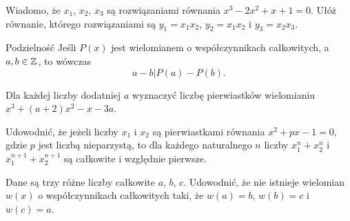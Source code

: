 \documentclass{article}
\begin{document}

%

\begin{zadanie}
  Wiadomo, że $x_1$, $x_2$, $x_3$ są rozwiązaniami równania $x^3-2x^2+x+1=0$. Ułóż równanie, którego rozwiązaniami są $y_1=x_1x_2$, $y_2=x_1x_2$ i $y_3=x_2x_3$.
\end{zadanie}

\begin{mybox}{Podzielność}
  Jeśli $P(x)$ jest wielomianem o współczynnikach całkowitych, a $a,b\in\mathbb{Z}$, to wówczas
  $$a-b|P(a)-P(b).$$
\end{mybox}


\begin{zadanie}
  Dla każdej liczby dodatniej $a$ wyznaczyć liczbę pierwiastków wielomianiu $x^3+(a+2)x^2-x-3a$.
\end{zadanie}

\begin{zadanie}
  Udowodnić, że jeżeli liczby $x_1$ i $x_2$ są pierwiastkami równania $x^2+px-1=0$, gdzie $p$ jest liczbą nieparzystą, to dla każdego naturalnego $n$ liczby $x_1^n+x_2^n$ i $x_1^{n+1}+x_2^{n+1}$ są całkowite i względnie pierwsze.
\end{zadanie}

\begin{zadanie}
  Dane są trzy różne liczby całkowite $a$, $b$, $c$. Udowodnić, że nie istnieje wielomian $w(x)$ o współczynnikach całkowitych taki, że $w(a)=b$, $w(b)=c$ i $w(c)=a$.
\end{zadanie}
\end{document}
